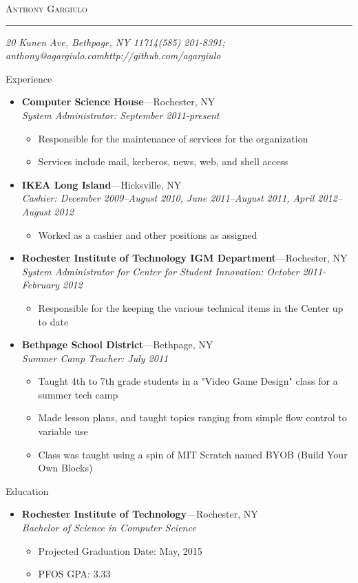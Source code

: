 \documentclass[11pt,oneside]{article}
\makeatletter
\newcommand{\name}{Anthony Gargiulo}
\newcommand{\addr}{20 Kunen Ave, Bethpage, NY 11714}
\newcommand{\phone}{(585) 201-8391}
\newcommand{\email}{anthony@agargiulo.com}
\newcommand{\github}{http://github.com/agargiulo}
\newcommand{\bigname}[1]{
	\begin{center}\fontfamily{phv}\selectfont\Huge\scshape#1\end{center}
}
\newenvironment{ressection}[1]{
	\vspace{3pt}
	{\fontfamily{phv}\selectfont\Large#1}
	\begin{itemize}
	\vspace{2pt}
}{
	\end{itemize}
}
\newcommand{\ressubitem}[1]{
	\vspace{-1pt}
	\item \begin{flushleft} #1 \end{flushleft}
}
\newcommand{\resbigitem}[3]{
	\vspace{-4pt}
	\item
	\textbf{#1}---#2 \\
	\textit{#3}
}
\newenvironment{ressubsec}[3]{
	\resbigitem{#1}{#2}{#3}
	\vspace{-1pt}
	\begin{itemize}
}{
	\end{itemize}
}
\makeatother
\begin{document}
 \selectfont

\bigname{\name}

\vspace{-4pt} \rule{\textwidth}{1pt}

\vspace{-1pt} {\small\itshape \addr \hfill \phone; \email \hfill \github}

\vspace{30 pt}



\begin{ressection}{Experience}

	\begin{ressubsec}{Computer Science House}{Rochester, NY}{System Administrator: September 2011-present}
		\ressubitem{Responsible for the maintenance of services for the organization}
		\ressubitem{Services include mail, kerberos, news, web, and shell access}
	\end{ressubsec}
	\begin{ressubsec}{IKEA Long Island}{Hicksville, NY}{Cashier: December 2009--August 2010, June 2011--August 2011, April 2012--August 2012}
		\ressubitem{Worked as a cashier and other positions as assigned}
	\end{ressubsec}
	\begin{ressubsec}{Rochester Institute of Technology IGM Department}{Rochester, NY}{System Administrator for Center for Student Innovation: October 2011-February 2012}
		\ressubitem{Responsible for the keeping the various technical items in the Center up to date}
	\end{ressubsec}
	\begin{ressubsec}{Bethpage School District}{Bethpage, NY}{Summer Camp Teacher: July 2011}
		\ressubitem{Taught 4th to 7th grade students in a "Video Game Design" class for a summer tech camp}
		\ressubitem{Made lesson plans, and taught topics ranging from simple flow control to variable use}
		\ressubitem{Class was taught using a spin of MIT Scratch named BYOB (Build Your Own Blocks)}
	\end{ressubsec}

\end{ressection}


\begin{ressection}{Education}

	\begin{ressubsec}{Rochester Institute of Technology}{Rochester, NY}{Bachelor of Science in Computer Science}
		\ressubitem{Projected Graduation Date: May, 2015}
		\ressubitem{PFOS GPA: 3.33}
	\end{ressubsec}

\end{ressection}
\end{document}
